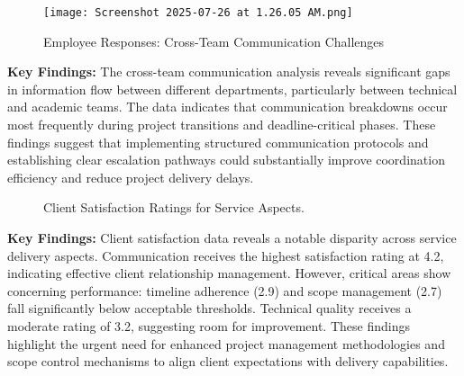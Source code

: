 \documentclass[12pt,a4paper,oneside]{book}
\begin{document}
\begin{figure}[H]
    \centering
    \texttt{[image: Screenshot 2025-07-26 at 1.26.05 AM.png]} %
    \caption{Employee Responses: Cross-Team Communication Challenges}
    \label{fig:communication_challenges}
\end{figure}

\textbf{Key Findings:} The cross-team communication analysis reveals significant gaps in information flow between different departments, particularly between technical and academic teams. The data indicates that communication breakdowns occur most frequently during project transitions and deadline-critical phases. These findings suggest that implementing structured communication protocols and establishing clear escalation pathways could substantially improve coordination efficiency and reduce project delivery delays.

\begin{figure}[h!]
    \centering
    \caption{Client Satisfaction Ratings for Service Aspects.}
    \label{fig:client_service_ratings}
\end{figure}

\textbf{Key Findings:} Client satisfaction data reveals a notable disparity across service delivery aspects. Communication receives the highest satisfaction rating at 4.2, indicating effective client relationship management. However, critical areas show concerning performance: timeline adherence (2.9) and scope management (2.7) fall significantly below acceptable thresholds. Technical quality receives a moderate rating of 3.2, suggesting room for improvement. These findings highlight the urgent need for enhanced project management methodologies and scope control mechanisms to align client expectations with delivery capabilities.
\end{document}
